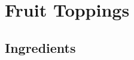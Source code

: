 \thispagestyle{fancy}
\section{Fruit Toppings}
\AddToShipoutPicture*{\FruitTopping}

\subsection*{Ingredients}